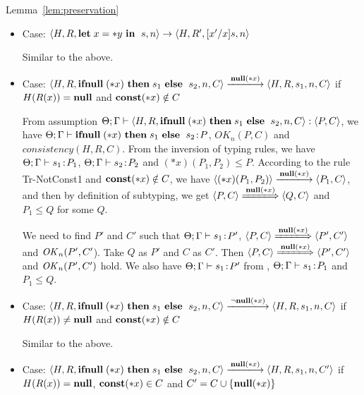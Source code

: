 \begin{pfof}{Lemma~\ref{lem:preservation}}
\begin{itemize}
  Similar to the above.

\item Case: \( \langle H, R, \mathbf{let}\; x = *y \ \mathbf{in}\; \ s, n\rangle
  \rightarrow \langle H, R', [x'/x]s, n\rangle \)

  Similar to the above.

\item Case: \(\langle H, R, \IFNULL \Sirx \ \THEN s_{1} \ \ELSE
  \ s_{2}, n, C\rangle \xlongrightarrow{\snull} \langle H, R, s_{1}, n, C \rangle\)
  if \(H(R(x)) = \mathbf{null}\) and \(\mathbf{const}(*x) \notin C\)

  From assumption \( \Theta; \Gamma \vdash \langle H, R, \mathbf{ifnull}\;(*x)
  \ \mathbf{then}\; s_{1} \ \mathbf{else}\; \ s_{2}, n, C \rangle : \langle P, C
  \rangle\), we have \(\Theta; \Gamma \vdash \mathbf{ifnull}\;(*x) \ \mathbf{then}\;
  s_{1} \ \mathbf{else}\; \ s_{2} \!:\! P \), \(OK_n(P, C)\) and \(consistency(H,
  R, C)\). From the inversion of typing rules, we have \(\Theta;
  \Gamma \vdash s_{1} \!:\! P_1\), \(\Theta; \Gamma \vdash s_{2} \!:\!
  P_2\) and \((*x)(P_1, P_2) \le P\). According to the rule
  Tr-NotConst1 and \(\mathbf{const}(*x) \notin C\), we have \(\langle
  (*x)(P_1, P_2) \rangle \xlongrightarrow{\snull} \langle P_1,
  C\rangle \), and then by definition of subtyping, we get \(\langle
  P, C \rangle \xLongrightarrow{\snull} \langle Q, C \rangle \) and
  \(P_1 \le Q\) for some \(Q\).

  We need to find \(P'\) and \(C'\) such that \(\Theta;\Gamma \vdash
  s_1\!:\! P'\), \( \langle P, C \rangle \xLongrightarrow{\snull}
  \langle P', C' \rangle\) and \(\mathit{OK}_n(P', C'\)). Take \(Q\) as \(P'\)
  and \(C\) as \(C'\). Then \( \langle P,C \rangle
  \xLongrightarrow{\snull} \langle P', C' \rangle\) and \(\mathit{OK}_n(P',
  C')\) hold.  We also have \(\Theta; \Gamma \vdash s_1 \!:\! P'\) from
  , \(\Theta; \Gamma \vdash s_1 \!:\! P_1\) and \( P_1 \le
  Q\).

\item Case: \(\langle H, R, \IFNULL \Sirx \ \THEN s_{1} \ \ELSE
  \ s_{2}, n, C\rangle \xlongrightarrow{\snnull} \langle H, R, s_{1}, n, C \rangle\)
  if \(H(R(x)) \neq \mathbf{null}\) and \(\mathbf{const}(*x) \notin C\)

    Similar to the above.
  
\item Case: \(\langle H, R, \IFNULL \Sirx \ \THEN s_{1} \ \ELSE
  \ s_{2}, n, C\rangle \xlongrightarrow{\snull} \langle H, R, s_{1}, n, C'
  \rangle\) if \(H(R(x)) = \mathbf{null}\), \(\mathbf{const}(*x) \in C\) and \(C' = C
  \cup \{{\bf null}(*x)\}\)


\end{itemize}
\end{pfof}
